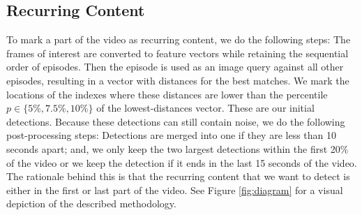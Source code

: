 \documentclass{report}
\begin{document}
\subsection{Recurring Content}
To mark a part of the video as recurring content, we do the following steps: The frames of interest are converted to feature vectors while retaining the sequential order of episodes. Then the episode is used as an image query against all other episodes, resulting in a vector with distances for the best matches. We mark the locations of the indexes where these distances are lower than the percentile $p \in \{5\%, 7.5\%, 10\%\}$ of the lowest-distances vector. These are our initial detections. Because these detections can still contain noise, we do the following post-processing steps: Detections are merged into one if they are less than 10 seconds apart; and, we only keep the two largest detections within the first 20\% of the video or we keep the detection if it ends in the last 15 seconds of the video. The rationale behind this is that the recurring content that we want to detect is either in the first or last part of the video. See Figure \ref{fig:diagram} for a visual depiction of the described methodology.
\end{document}
